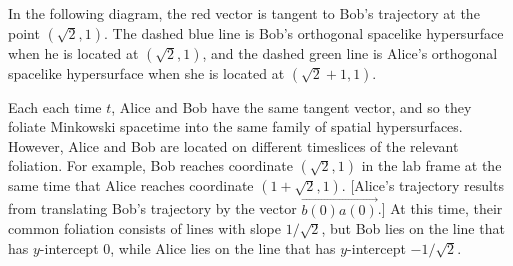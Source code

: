 \documentclass[tikz,border=10pt,fleqn]{article}
\theoremstyle{definition}
\newcommand{\vecc}[1]{\overrightarrow{#1}}
\begin{document}
In the following diagram, the red vector is tangent to Bob's
trajectory at the point $(\sqrt{2},1)$. The dashed blue line is Bob's
orthogonal spacelike hypersurface when he is located at
$(\sqrt{2},1)$, and the dashed green line is Alice's orthogonal
spacelike hypersurface when she is located at $(\sqrt{2}+1,1)$.

\bigskip \noindent {}

  \bigskip \noindent Each each time $t$, Alice and Bob have the same
  tangent vector, and so they foliate Minkowski spacetime into the
  same family of spatial hypersurfaces. However, Alice and Bob are
  located on different timeslices of the relevant foliation. For
  example, Bob reaches coordinate $(\sqrt{2},1)$ in the lab frame at
  the same time that Alice reaches coordinate
  $(1+\sqrt{2},1)$. [Alice's trajectory results from translating Bob's
  trajectory by the vector $\vecc{b(0)a(0)}$.]  At this time, their
  common foliation consists of lines with slope $1/\sqrt{2}$, but Bob
  lies on the line that has $y$-intercept $0$, while Alice lies on the
  line that has $y$-intercept $-1/\sqrt{2}$.
\end{document}
